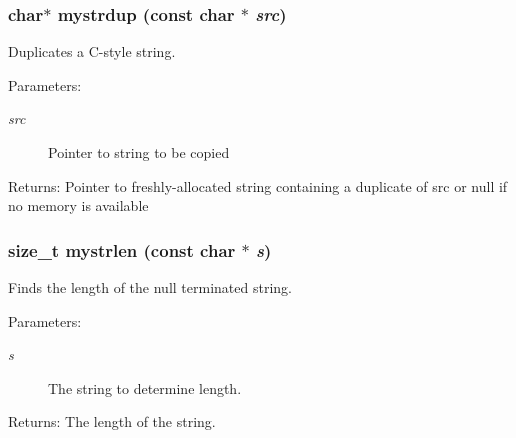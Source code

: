 \subsubsection{\setlength{\rightskip}{0pt plus 5cm}char$\ast$ mystrdup (const char $\ast$ {\em src})}\label{mystring_8h_148a52c665d88f52fb4995338a319d3c}


Duplicates a C-style string. \begin{Desc}
\item[Parameters:]
\begin{description}
\item[{\em src}]Pointer to string to be copied \end{description}
\end{Desc}
\begin{Desc}
\item[Returns:]Pointer to freshly-allocated string containing a duplicate of src or null if no memory is available \end{Desc}
\subsubsection{\setlength{\rightskip}{0pt plus 5cm}size\_\-t mystrlen (const char $\ast$ {\em s})}\label{mystring_8h_a231246d7f6f97231aa18689cc2ea20a}


Finds the length of the null terminated string. 

\begin{Desc}
\item[Parameters:]
\begin{description}
\item[{\em s}]The string to determine length. \end{description}
\end{Desc}
\begin{Desc}
\item[Returns:]The length of the string. \end{Desc}
